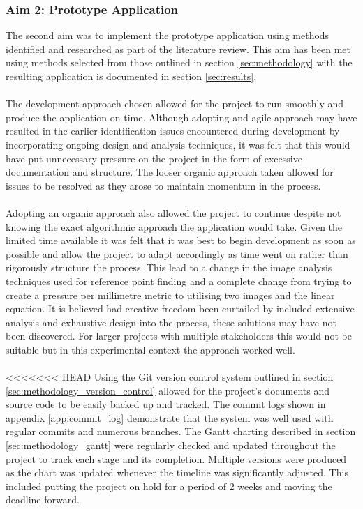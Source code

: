 		\subsubsection{Aim 2: Prototype Application}
			The second aim was to implement the prototype application using methods identified and researched as part of the literature review. This aim has been met using methods selected from those outlined in section \ref{sec:methodology} with the resulting application is documented in section \ref{sec:results}.
			\\\\
			The development approach chosen allowed for the project to run smoothly and produce the application on time. Although adopting and agile approach may have resulted in the earlier identification issues encountered during development by incorporating ongoing design and analysis techniques, it was felt that this would have put unnecessary pressure on the project in the form of excessive documentation and structure. The looser organic approach taken allowed for issues to be resolved as they arose to maintain momentum in the process. 
			\\\\
			Adopting an organic approach also allowed the project to continue despite not knowing the exact algorithmic approach the application would take. Given the limited time available it was felt that it was best to begin development as soon as possible and allow the project to adapt accordingly as time went on rather than rigorously structure the process. This lead to a change in the image analysis techniques used for reference point finding and a complete change from trying to create a pressure per millimetre metric to utilising two images and the linear equation. It is believed had creative freedom been curtailed by included extensive analysis and exhaustive design into the process, these solutions may have not been discovered. For larger projects with multiple stakeholders this would not be suitable but in this experimental context the approach worked well.
			\\\\
<<<<<<< HEAD
			Using the Git version control system outlined in section \ref{sec:methodology_version_control} allowed for the project's documents and source code to be easily backed up and tracked. The commit logs shown in appendix \ref{app:commit_log} demonstrate that the system was well used with regular commits and numerous branches. The Gantt charting described in section \ref{sec:methodology_gantt} were regularly checked and updated throughout the project to track each stage and its completion. Multiple versions were produced as the chart was updated whenever the timeline was significantly adjusted. This included putting the project on hold for a period of 2 weeks and moving the deadline forward.
